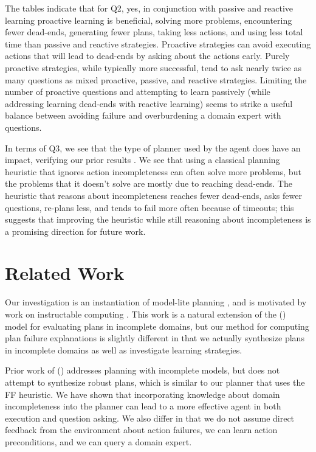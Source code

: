 \documentclass[letterpaper]{article}
\def\citep#1{\cite{#1}}
\def\citet#1{\citeauthor{#1} (\citeyear{#1})}
\begin{document}
The tables indicate that for Q2, yes, in conjunction with passive and reactive
learning proactive learning is beneficial, solving more problems, encountering fewer
dead-ends, generating fewer plans, taking less actions, and using less total
time than passive and reactive strategies.  Proactive strategies can avoid
executing actions that will lead to dead-ends by asking about the actions early.
Purely proactive strategies, while typically more successful, tend to ask nearly
twice as many questions as mixed proactive, passive, and reactive strategies. 
Limiting the number of proactive questions and attempting to learn passively
(while addressing learning dead-ends with reactive learning) seems to strike a
useful balance between avoiding failure and overburdening a domain expert with
questions.

In terms of Q3, we see that the type of planner used by the agent does have an
impact, verifying our prior results \citep{bryce-icaps11}.  We see that using a
classical planning heuristic that ignores action incompleteness can often solve
more problems, but the problems that it doesn't solve are mostly due to reaching
dead-ends.  The heuristic that reasons about incompleteness reaches fewer
dead-ends, asks fewer questions, re-plans less, and tends to fail more often
because of timeouts; this suggests that improving the heuristic while still
reasoning about incompleteness is a promising direction for future work.


\section{Related Work}



Our investigation is an instantiation of model-lite planning \citep{modellite},
and is motivated by work on instructable computing \citep{mable}. This work is a
natural extension of the \citet{Garland02} model for evaluating plans in
incomplete domains, but our method for computing plan failure explanations
is slightly different in that we actually synthesize plans in incomplete
domains as well as investigate learning strategies.

Prior work of \citet{DBLP:conf/aips/ChangA06} addresses planning with incomplete
models, but does not attempt to synthesize robust plans, which is similar to our
planner that uses the FF heuristic.  We have shown that incorporating knowledge
about domain incompleteness into the planner can lead to a more effective agent
in both execution and question asking. We also differ in that we do not assume
direct feedback from the environment about action failures, we can learn
action preconditions, and we can query a domain expert.
\end{document}
